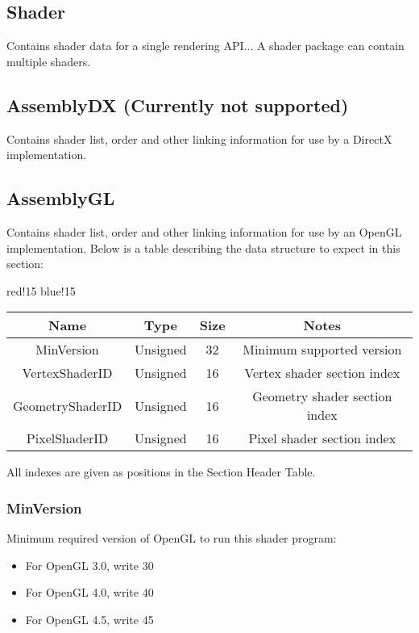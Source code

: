 \subsection{Shader}
Contains shader data for a single rendering API...\newline
A shader package can contain multiple shaders.

\subsection{AssemblyDX (Currently not supported)}
Contains shader list, order and other linking information for use by a DirectX \cite{DirectX} implementation.

\subsection{AssemblyGL}
Contains shader list, order and other linking information for use by an OpenGL \cite{OpenGL} implementation.\newline
Below is a table describing the data structure to expect in this section:
\begin{center}
    {
        {red!15}
        {blue!15}
        \begin{tabular}{|c|c|c|c|}
            \hline
            \textbf{Name} & \textbf{Type} & \textbf{Size} & \textbf{Notes} \\
    
            \hline\hline
            MinVersion & Unsigned & 32 & Minimum supported version \\
            VertexShaderID & Unsigned & 16 & Vertex shader section index \\
            GeometryShaderID & Unsigned & 16 & Geometry shader section index \\
            PixelShaderID & Unsigned & 16 & Pixel shader section index \\
            \hline
        \end{tabular}
    }
\end{center}
All indexes are given as positions in the Section Header Table.

\subsubsection{MinVersion}
Minimum required version of OpenGL to run this shader program:
\begin{itemize}
    \item For OpenGL 3.0, write 30
    \item For OpenGL 4.0, write 40
    \item For OpenGL 4.5, write 45
\end{itemize}


